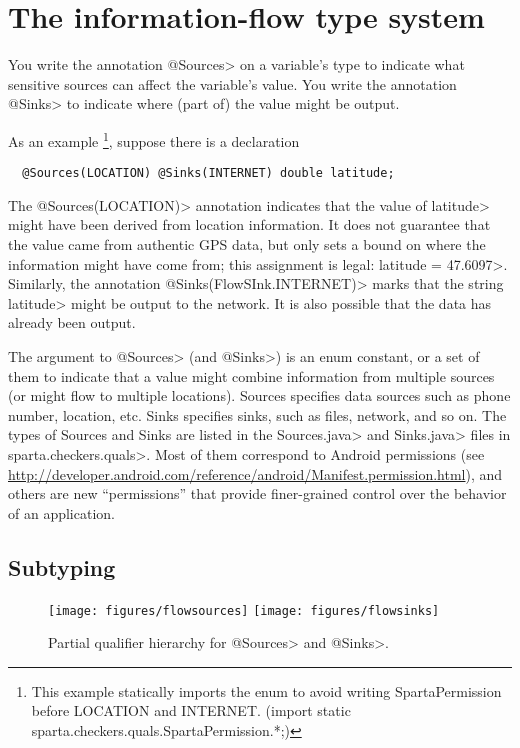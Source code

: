 \section{The information-flow type system\label{sec:flow-type-system}}

You write the annotation \<@Sources> on a variable's
type to indicate what sensitive sources can affect the variable's value.
You write the annotation \<@Sinks> to indicate where (part of) the
value might be output.

As an example
\footnote{This example statically imports the enum to avoid writing SpartaPermission before LOCATION and INTERNET. (import static sparta.checkers.quals.SpartaPermission.*;)}, suppose there is a declaration
\begin{Verbatim}
  @Sources(LOCATION) @Sinks(INTERNET) double latitude;
\end{Verbatim}
\noindent
The \<@Sources(LOCATION)> annotation indicates that the
value of \<latitude> might have been derived from
location information.  It does not guarantee that the value came from
authentic GPS data, but only sets a bound on where the information might
have come from; this assignment is legal: \<latitude = 47.6097>.
Similarly, the annotation \<@Sinks(FlowSInk.INTERNET)> marks that
the string \<latitude> might be output to the network.  It is also
possible that the data has already been output.

The argument to \<@Sources> (and \<@Sinks>) is an enum constant, or a
set of them to indicate that a value might combine information from
multiple sources (or might flow to multiple locations).
Sources specifies data sources such as phone number, location, 
etc.  Sinks specifies sinks, such as files, network, and so on.
The types of Sources and Sinks are listed in the
\<Sources.java> and \<Sinks.java> files in \<sparta.checkers.quals>.
Most of them correspond to Android permissions (see 
\url{http://developer.android.com/reference/android/Manifest.permission.html}),
and others are new ``permissions'' that provide finer-grained control over
the behavior of an application.


\subsection{Subtyping\label{sec:subtyping}}

\begin{figure}
\centerline{\texttt{[image: figures/flowsources]}%
  \hfill%
  \texttt{[image: figures/flowsinks]}}
\caption{Partial qualifier hierarchy for \<@Sources> and \<@Sinks>.}
\label{fig:flow-hierarchy}
\end{figure}

